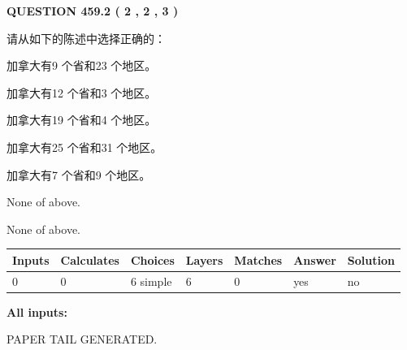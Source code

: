 \documentclass{ctexart}
\begin{document}
   
  
\vspace{0.2in}
  
{\textbf{\Large{QUESTION
459.2 
 ( 2 , 2 , 3 )
}}}
  
  
请从如下的陈述中选择正确的：
 
 
加拿大有9 个省和23 个地区。
 
 
加拿大有12 个省和3 个地区。
 
 
加拿大有19 个省和4 个地区。
 
 
加拿大有25 个省和31 个地区。
 
 
加拿大有7 个省和9 个地区。
 
 
 None of above.
 
 
\noindent{}
 
 
 None of above.
 
 
\noindent{}
 
 
   
   
   
   
\noindent\begin{tabular}{|l|l|l|l|l|l|l|}
 \hline
Inputs & Calculates & Choices & Layers & Matches & Answer & Solution \\ \hline
 0  & 
 0  & 
 6
  simple  
  & 
 6  & 
 0  & 
  yes & 
  no 
  \\ \hline
 \end{tabular}
   
   
   
   
\noindent{}
   
   
   
   
\noindent\vspace{0.1in}\hspace{-0.08in} {\textbf{\Large{All inputs: }}}
   
   
   
   
   
   
 \vspace{0.2in}
 
   
   
\vspace{2.0in} PAPER TAIL GENERATED.
   
\end{document}
